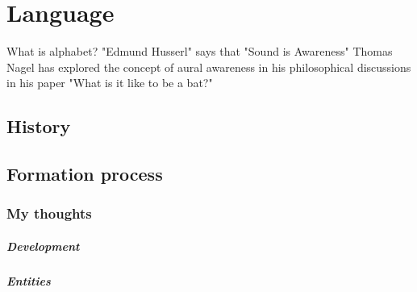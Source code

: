 \chapter{Language}

What is alphabet? "Edmund Husserl" says that "Sound is Awareness" Thomas Nagel has explored the concept of aural awareness in his philosophical discussions in his paper "What is it like to be a bat?"

\section{History}

\section{Formation process}
    \subsection{My thoughts}
        
        \paragraph{Development}
            
            \begin{figure}[H]
                \raggedright
            \end{figure}
            
        \paragraph{Entities}
            
